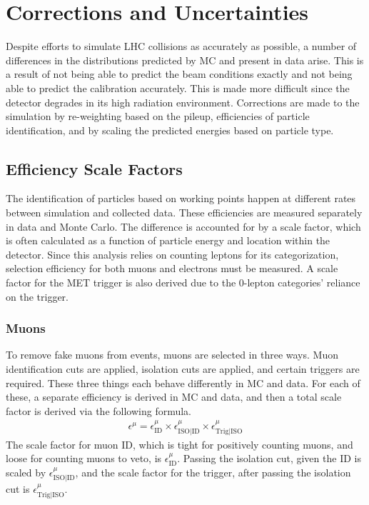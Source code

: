 \chapter{Corrections and Uncertainties}

Despite efforts to simulate LHC collisions as accurately as possible,
a number of differences in the distributions predicted by MC and present in data arise.
This is a result of not being able to predict the beam conditions exactly
and not being able to predict the calibration accurately.
This is made more difficult since the detector degrades in its high radiation environment.
Corrections are made to the simulation by re-weighting based on the pileup,
efficiencies of particle identification,
and by scaling the predicted energies based on particle type.

\section{Efficiency Scale Factors}

The identification of particles based on working points happen at different rates
between simulation and collected data.
These efficiencies are measured separately in data and Monte Carlo.
The difference is accounted for by a scale factor,
which is often calculated as a function of particle energy and location within the detector.
Since this analysis relies on counting leptons for its categorization,
selection efficiency for both muons and electrons must be measured.
A scale factor for the MET trigger is also derived due to
the 0-lepton categories' reliance on the trigger.

\subsection{Muons}

To remove fake muons from events, muons are selected in three ways.
Muon identification cuts are applied, isolation cuts are applied,
and certain triggers are required.
These three things each behave differently in MC and data.
For each of these, a separate efficiency is derived in MC and data,
and then a total scale factor is derived via the following formula.
\begin{gather}
  \epsilon^\mu = \epsilon^\mu_\mathrm{ID} \times \epsilon^\mu_\mathrm{ISO|ID} \times \epsilon^\mu_\mathrm{Trig|ISO}
\end{gather}
The scale factor for muon ID, which is tight for positively counting muons,
and loose for counting muons to veto, is $\epsilon^\mu_\mathrm{ID}$.
Passing the isolation cut, given the ID is scaled by $\epsilon^\mu_\mathrm{ISO|ID}$,
and the scale factor for the trigger, after passing the isolation cut is
$\epsilon^\mu_\mathrm{Trig|ISO}$.

